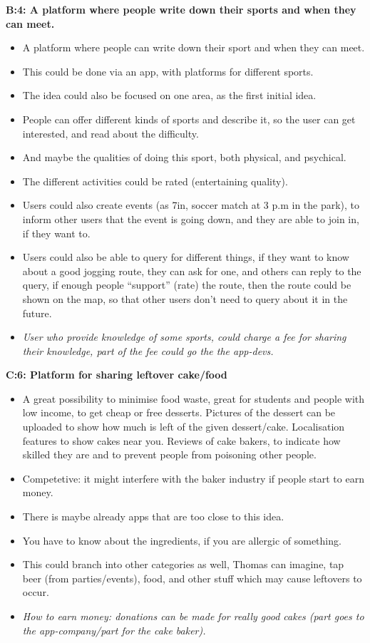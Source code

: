 \begin{multicols}{2}
{\begin{itemize}
{}
\end{itemize}
\vspace{2em}
{\noindent \textbf{B:4: A platform where people write down their  sports and when they can meet.}}
\begin{itemize}
	\item A platform where people can write down their sport and when they can meet.
	\item This could be done via an app, with platforms for different sports.
	\item The idea could also be focused on one area, as the first initial idea.
	\item People can offer different kinds of sports and describe it, so the user can get interested, and read about the difficulty.
	\item And maybe the qualities of doing this sport, both physical, and psychical.
	\item The different activities could be rated (entertaining quality).
	\item Users could also create events (as 7in, soccer match at 3 p.m in the park), to inform other users that the event is going down, and they are able to join in, if they want to.
	\item Users could also be able to query for different things, if they want to know about a good jogging route, they can ask for one, and others can reply to the query, if enough people “support” (rate) the route, then the route could be shown on the map, so that other users don’t need to query about it in the future.
	\item \textit{User who provide knowledge of some sports, could charge a fee for sharing their knowledge, part of the fee could go the the app-devs.}
\end{itemize}
\vspace{2em}
{\noindent \textbf{C:6: Platform for sharing leftover cake/food}}
\begin{itemize}
	\item A great possibility to minimise food waste, great for students and people with low income, to get cheap or free desserts. Pictures of the dessert can be uploaded to show how much is left of the given dessert/cake. Localisation features to show cakes near you. Reviews of cake bakers, to indicate how skilled they are and to prevent people from poisoning other people.
	\item Competetive: it might interfere with the baker industry if people start to earn money.
	\item There is maybe already apps that are too close to this idea. 
	\item You have to know about the ingredients, if you are allergic of something.
	\item This could branch into other categories as well, Thomas can imagine, tap beer (from parties/events), food, and other stuff which may cause leftovers to occur.
	\item \textit{How to earn money: donations can be made for really good cakes (part goes to the app-company/part for the cake baker).}
\end{itemize}
}
\end{multicols}